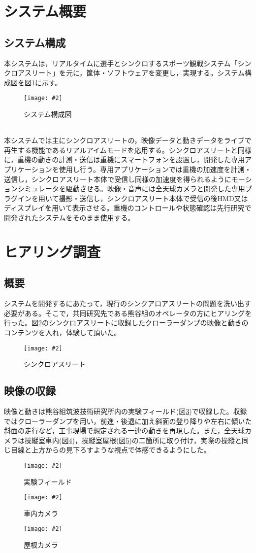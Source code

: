 \documentclass[a4paper,12pt]{jsarticle}
\newcommand{\figuref}[1]{図\ref{#1}}
\newcommand{\fig}[4][width=\textwidth]{
    \begin{figure}[!h]
    \begin{center}
    \texttt{[image: \#2]}
    \caption{#3}
    \label{#4}
    \vspace*{-1cm}
    \end{center}
    \end{figure}
}
\begin{document}
\clearpage

\section{システム概要}
\subsection{システム構成}
本システムは，リアルタイムに選手とシンクロするスポーツ観戦システム「シンクロアスリート」\cite{synchro}を元に，筐体・ソフトウェアを変更し，実現する。システム構成図を\figuref{sys_config}に示す。
\fig{image/sys_config.png}{システム構成図}{sys_config}
\\

本システムでは主にシンクロアスリートの，映像データと動きデータをライブで再生する機能であるリアルアイムモードを応用する。シンクロアスリートと同様に，重機の動きの計測・送信は重機にスマートフォンを設置し，開発した専用アプリケーションを使用し行う。専用アプリケーションでは重機の加速度を計測・送信し，シンクロアスリート本体で受信し同様の加速度を得られるようにモーションシミュレータを駆動させる。映像・音声には全天球カメラと開発した専用プラグインを用いて撮影・送信し，シンクロアスリート本体で受信の後HMD又はディスプレイを用いて表示させる。重機のコントロールや状態確認は先行研究で開発されたシステム\cite{kumagai_mujin}をそのまま使用する。

\clearpage

\section{ヒアリング調査}
\subsection{概要}
システムを開発するにあたって，現行のシンクアロアスリートの問題を洗い出す必要がある。そこで，共同研究先である熊谷組のオペレータの方にヒアリングを行った。\figuref{synchro_image}のシンクロアスリートに収録したクローラーダンプの映像と動きのコンテンツを入れ，体験して頂いた。
\fig[width=9cm]{image/synchro_image.jpg}{シンクロアスリート}{synchro_image}

\subsection{映像の収録}
映像と動きは熊谷組筑波技術研究所内の実験フィールド(\figuref{test_field})で収録した。収録ではクローラーダンプを用い，前進・後退に加え斜面の登り降りや左右に傾いた斜面の走行など，工事現場で想定される一連の動きを再現した。また，全天球カメラは操縦室車内(\figuref{inside_camera})，操縦室屋根(\figuref{outside_camera})の二箇所に取り付け，実際の操縦と同じ目線と上方からの見下ろすような視点で体感できるようにした。
\fig[width=7cm]{image/test_field.jpg}{実験フィールド}{test_field}
\fig[width=7cm]{image/inside_camera.png}{車内カメラ}{inside_camera}
\fig[width=7cm]{image/outside_camera.jpg}{屋根カメラ}{outside_camera}
\end{document}

